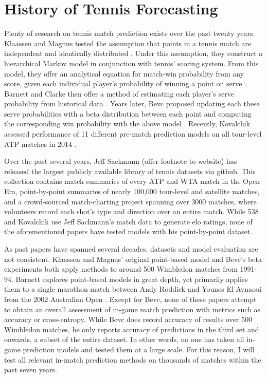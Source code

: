 \documentclass[chapterprefix=false]{report}
\begin{document}



\section{History of Tennis Forecasting}
Plenty of research on tennis match prediction exists over the past twenty years. Klaassen and Magnus tested the assumption that points in a tennis match are independent and identically distributed \cite{KlaassenandMagnus2001}. Under this assumption, they construct a hierarchical Markov model in conjunction with tennis’ scoring system. From this model, they offer an analytical equation for match-win probability from any score, given each individual player's probability of winning a point on serve \cite{Klaassen2003}.  Barnett and Clarke then offer a method of estimating each player's serve probability from historical data \cite{BarnettandClarke2005}. Years later, Bevc proposed updating each these serve probabilities with a beta distribution between each point and computing the corresponding win probability with the above model \cite{Bevc2015}. Recently, Kovalchik assessed performance of 11 different pre-match prediction models on all tour-level ATP matches in 2014 \cite{Kovalchik2016}.

Over the past several years, Jeff Sackmann (offer footnote to website) has released the largest publicly available library of tennis datasets via github. This collection contains match summaries of every ATP and WTA match in the Open Era, point-by-point summaries of nearly 100,000 tour-level and satellite matches, and a crowd-sourced match-charting project spanning over 3000 matches, where volunteers record each shot’s type and direction over an entire match. While 538 and Kovalchik use Jeff Sackmann’s match data to generate elo ratings, none of the aforementioned papers have tested models with his point-by-point dataset.

As past papers have spanned several decades, datasets and model evaluation are not consistent. Klaassen and Magnus' original point-based model and Bevc's beta experiments both apply methods to around 500 Wimbledon matches from 1991-94. Barnett explores point-based models in great depth, yet primarily applies them to a single marathon match between Andy Roddick and Younes El Aynaoui from the 2002 Australian Open \cite{Barnett2006}. Except for Bevc, none of these papers attempt to obtain an overall assessment of in-game match prediction with metrics such as accuracy or cross-entropy. While Bevc does record accuracy of results over 500 Wimbledon matches, he only reports accuracy of predictions in the third set and onwards, a subset of the entire dataset. In other words, no one has taken all in-game prediction models and tested them at a large scale. For this reason, I will test all relevant in-match prediction methods on thousands of matches within the past seven years.
\end{document}
